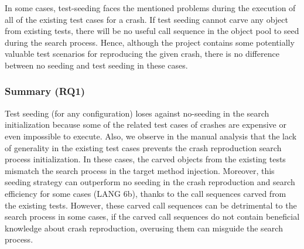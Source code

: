 In some cases, test-seeding faces the mentioned problems during the execution of all of the existing test cases for a crash. If test seeding cannot carve any object from existing tests, there will be no useful call sequence in the object pool to seed during the search process. Hence, although the project contains some potentially valuable test scenarios for reproducing the given crash, there is no difference between no seeding and test seeding in these cases.



\subsubsection{Summary (\textbf{RQ1)}}

Test seeding (for any configuration) loses against no-seeding in the search initialization because some of the related test cases of crashes are expensive or even impossible to execute.
Also, we observe in the manual analysis that the lack of generality in the existing test cases prevents the crash reproduction search process initialization. In these cases, the carved objects from the existing tests mismatch the search process in the target method injection.
Moreover, this seeding strategy can outperform no seeding in the crash reproduction and search efficiency for some cases (\eg LANG 6b), thanks to the call sequences carved from the existing tests. However, these carved call sequences can be detrimental to the search process in some cases, if the carved call sequences do not contain beneficial knowledge about crash reproduction, overusing them can misguide the search process.


